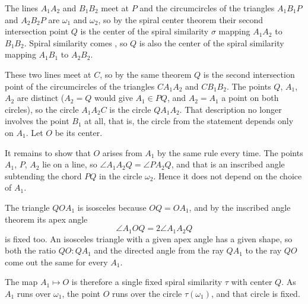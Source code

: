 {
    The lines $A_1A_2$ and $B_1B_2$ meet at $P$ and the circumcircles of the triangles $A_1B_1P$ and $A_2B_2P$ are $\omega_1$ and $\omega_2$, so by the spiral center theorem their second intersection point $Q$ is the center of the spiral similarity $\sigma$ mapping $A_1A_2$ to $B_1B_2$. Spiral similarity comes , so $Q$ is also the center of the spiral similarity mapping $A_1B_1$ to $A_2B_2$.

    These two lines meet at $C$, so by the same theorem $Q$ is the second intersection point of the circumcircles of the triangles $CA_1A_2$ and $CB_1B_2$. The points $Q$, $A_1$, $A_2$ are distinct ($A_2 = Q$ would give $A_1 \in PQ$, and $A_2 = A_1$ a point on both circles), so the circle $A_1A_2C$ is the circle $QA_1A_2$. That description no longer involves the point $B_1$ at all, that is, the circle from the statement depends only on $A_1$. Let $O$ be its center.


    It remains to show that $O$ arises from $A_1$ by the same rule every time. The points $A_1$, $P$, $A_2$ lie on a line, so $\angle A_1A_2Q = \angle PA_2Q$, and that is an inscribed angle subtending the chord $PQ$ in the circle $\omega_2$. Hence it does not depend on the choice of $A_1$.

    The triangle $QOA_1$ is isosceles because $OQ = OA_1$, and by the inscribed angle theorem its apex angle
    $$
    \angle A_1OQ = 2\angle A_1A_2Q
    $$
    is fixed too. An isosceles triangle with a given apex angle has a given shape, so both the ratio $QO : QA_1$ and the directed angle from the ray $QA_1$ to the ray $QO$ come out the same for every $A_1$.

    The map $A_1 \mapsto O$ is therefore a single fixed spiral similarity $\tau$ with center $Q$. As $A_1$ runs over $\omega_1$, the point $O$ runs over the circle $\tau(\omega_1)$, and that circle is fixed.
}

